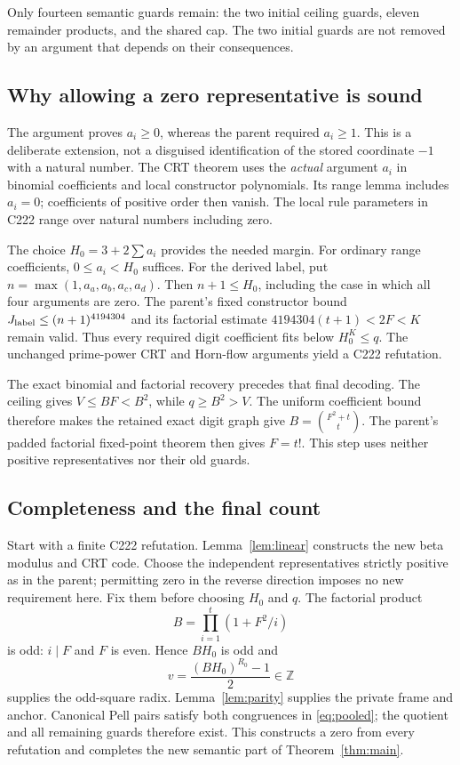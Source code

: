 \documentclass[11pt]{article}
\theoremstyle{remark}\newtheorem{remark}[theorem]{Remark}
\newcommand{\Z}{\mathbb Z}\newcommand{\N}{\mathbb N}
\begin{document}
Only fourteen semantic guards remain: the two initial ceiling guards,
eleven remainder products, and the shared cap. The two initial guards are
not removed by an argument that depends on their consequences.

\subsection{Why allowing a zero representative is sound}

The argument proves $a_i\ge0$, whereas the parent required $a_i\ge1$.
This is a deliberate extension, not a disguised identification of the
stored coordinate $-1$ with a natural number. The CRT theorem uses the
\emph{actual} argument $a_i$ in binomial coefficients and local constructor
polynomials. Its range lemma includes $a_i=0$; coefficients of positive
order then vanish. The local rule parameters in C222 range over natural
numbers including zero.

The choice $H_0=3+2\sum a_i$ provides the needed margin. For ordinary
range coefficients, $0\le a_i<H_0$ suffices. For the derived label, put
$n=\max(1,a_a,a_b,a_c,a_d)$. Then $n+1\le H_0$, including the case in
which all four arguments are zero. The parent's fixed constructor bound
$J_{\rm label}\le(n+1)^{4194304}$ and its factorial estimate
$4194304(t+1)<2F<K$ remain valid. Thus every required digit coefficient
fits below $H_0^K\le q$. The unchanged prime-power CRT and Horn-flow
arguments yield a C222 refutation.

The exact binomial and factorial recovery precedes that final decoding.
The ceiling gives $V\le BF<B^2$, while $q\ge B^2>V$. The uniform
coefficient bound therefore makes the retained exact digit graph give
$B=\binom{F^2+t}{t}$. The parent's padded factorial fixed-point theorem
then gives $F=t!$. This step uses neither positive representatives nor
their old guards.

\subsection{Completeness and the final count}

Start with a finite C222 refutation. Lemma~\ref{lem:linear} constructs the
new beta modulus and CRT code. Choose the independent representatives
strictly positive as in the parent; permitting zero in the reverse
direction imposes no new requirement here. Fix them before choosing
$H_0$ and $q$. The factorial product
\[
 B=\prod_{i=1}^t(1+F^2/i)
\]
is odd: $i\mid F$ and $F$ is even. Hence $BH_0$ is odd and
\[
 v=\frac{(BH_0)^{R_0}-1}{2}\in\Z
\]
supplies the odd-square radix. Lemma~\ref{lem:parity} supplies the private
frame and anchor. Canonical Pell pairs satisfy both congruences in
\eqref{eq:pooled}; the quotient and all remaining guards therefore exist.
This constructs a zero from every refutation and completes the new
semantic part of Theorem~\ref{thm:main}.
\end{document}
